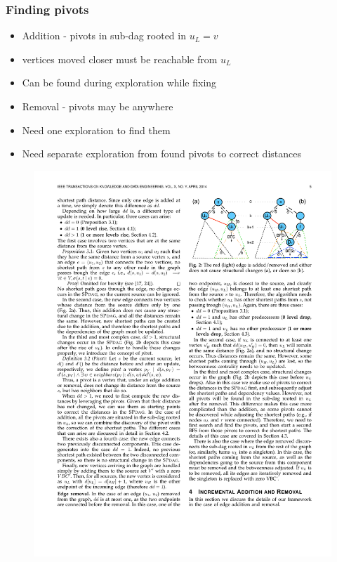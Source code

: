 \begin{frame}
  \frametitle{Finding pivots}

  \begin{itemize}
    \item Addition - pivots in sub-dag rooted in $u_L = v$
    \item vertices moved closer must be reachable from $u_L$
    \item Can be found during exploration while fixing \paths
  \end{itemize}
  \begin{itemize}
    \item Removal - pivots may be anywhere
    \item Need one exploration to find them
    \item Need separate exploration from found pivots to correct distances
  \end{itemize}

  \begin{figure}[t]
    \centering
    \includegraphics[width=\textwidth, height=0.5\textheight, keepaspectratio]{imgs/kdb-bfs}
  \end{figure}

\end{frame}


